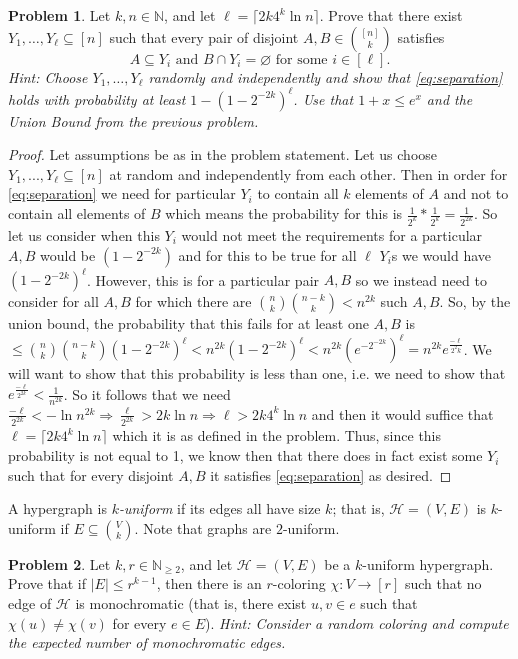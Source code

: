 \documentclass[11pt]{amsart}
\newcommand\cH{{\mathcal H}}
\theoremstyle{definition}
\newtheorem{problem}{Problem}[]
\begin{document}
\clearpage
\begin{problem}
  Let $k, n \in \mathbb N$, and let $\ell = \lceil 2k 4^k \ln n\rceil$.  Prove that there exist $Y_1, \dots, Y_\ell \subseteq [n]$ such that every pair of disjoint $A, B \in \binom{[n]}{k}$ satisfies
  \begin{equation}\tag{$\dagger$}\label{eq:separation}
    A \subseteq Y_i \text{ and } B \cap Y_i = \varnothing \text{ for some } i \in [\ell].
  \end{equation}
  \textit{Hint: Choose $Y_1, \dots, Y_\ell$ randomly and independently and show that \eqref{eq:separation} holds with probability at least $1 - (1 - 2^{-2k})^\ell$.  Use that $1 + x \leq e^x$ and the Union Bound from the previous problem.}
\end{problem}

\begin{proof}
    Let assumptions be as in the problem statement. Let us choose $Y_1, ..., Y_\ell \subseteq [n]$ at random and independently from each other. Then in order for \eqref{eq:separation} we need for particular $Y_i$ to contain all $k$ elements of $A$ and not to contain all elements of $B$ which means the probability for this is $\frac{1}{2^k} * \frac{1}{2^k} = \frac{1}{2^{2k}}$. So let us consider when this $Y_i$ would not meet the requirements for a particular $A, B$ would be $(1-2^{-2k})$ and for this to be true for all $\ell$ $Y_i$s we would have $(1-2^{-2k})^\ell$. However, this is for a particular pair $A, B$ so we instead need to consider for all $A, B$ for which there are $\binom{n}{k}\binom{n - k}{k} < n^{2k}$ such $A, B.$ So, by the union bound, the probability that this fails for at least one $A, B$ is $\leq \binom{n}{k}\binom{n-k}{k}(1-2^{-2k})^\ell < n^{2k}(1-2^{-2k})^\ell < n^{2k}(e^{-2^{-2k}})^\ell = n^{2k}e^{\frac{-\ell}{2^2k}}$. We will want to show that this probability is less than one, i.e. we need to show that $e^{\frac{-\ell}{2^{2k}}} < \frac{1}{n^{2k}}$. So it follows that we need $\frac{-\ell}{2^{2k}} < -\ln{{n^{2k}}} \Rightarrow \frac{\ell}{2^{2k}} > 2k\ln{n} \Rightarrow \ell > 2k4^k\ln{n}$ and then it would suffice that $\ell = \lceil 2k4^k\ln{n}\rceil$ which it is as defined in the problem. Thus, since this probability is not equal to 1, we know then that there does in fact exist some $Y_i$ such that for every disjoint $A, B$ it satisfies \eqref{eq:separation} as desired. 
\end{proof}

\clearpage
A hypergraph is \textit{$k$-uniform} if its edges all have size $k$; that is, $\cH = (V, E)$ is $k$-uniform if $E \subseteq \binom{V}{k}$.  Note that graphs are $2$-uniform.
\begin{problem}
  Let $k,r \in \mathbb N_{\geq 2}$, and let $\cH = (V, E)$ be a $k$-uniform hypergraph.  Prove that if $|E| \leq r^{k - 1}$, then there is an $r$-coloring $\chi : V \rightarrow [r]$ such that no edge of $\cH$ is monochromatic (that is, there exist $u, v \in e$ such that $\chi(u) \neq \chi(v)$ for every $e \in E$).  \textit{Hint: Consider a random coloring and compute the expected number of monochromatic edges.}
\end{problem}
\end{document}
